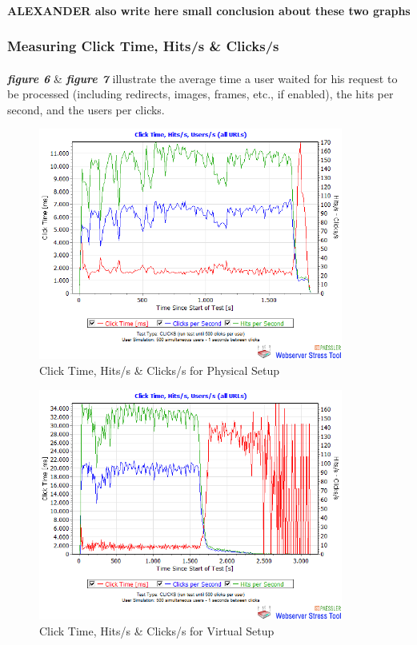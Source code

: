 \paragraph{}
\textbf{ALEXANDER also write here small conclusion about these two graphs}



\subsubsection{Measuring Click Time, Hits/s \& Clicks/s}
\paragraph{}

\textbf{\textit{figure 6}} \& \textbf{\textit{figure 7}} illustrate the average time a user waited for his request to be processed (including redirects, images, frames, etc., if enabled), the hits per second, and the users per clicks. 

 \begin{figure}[H]
    \centering
    \includegraphics[width=10cm]{Pictures/ph2.png}
    \caption{Click Time, Hits/s \& Clicks/s for Physical Setup}
    \label{fig:QQ3}
\end{figure}
   
 
\begin{figure}[H]
    \centering
    \includegraphics[width=10cm]{Pictures/vm2.png}
    \caption{Click Time, Hits/s \& Clicks/s for Virtual Setup}
    \label{fig:QQ3}
\end{figure} 


